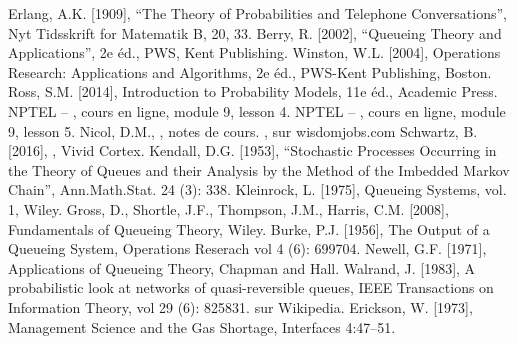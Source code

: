 \begin{thebibliography}{99}
 Erlang, A.K. [1909], ``The Theory of Probabilities and Telephone Conversations'', Nyt Tidsskrift for Matematik B, 20, 33.
 Berry, R. [2002], ``Queueing Theory and Applications'', 2e \'ed., PWS, Kent Publishing.
 Winston, W.L. [2004], Operations Research: Applications and Algorithms, 2e \'ed., PWS-Kent Publishing, Boston.
 Ross, S.M. [2014], Introduction to Probability Models,  11e \'ed., Academic Press. 
 NPTEL --  , cours en ligne, module 9, lesson 4.
 NPTEL --  , cours en ligne, module 9, lesson 5.
 Nicol, D.M., , notes de cours.
 , sur wisdomjobs.com
Schwartz, B. [2016],  , Vivid Cortex.
 Kendall, D.G. [1953], ``Stochastic Processes Occurring in the Theory of Queues and their Analysis by the Method of the Imbedded Markov Chain'', Ann.Math.Stat. 24 (3): 338.
 Kleinrock, L. [1975], Queueing Systems, vol. 1, Wiley.
 Gross, D., Shortle, J.F., Thompson, J.M., Harris, C.M. [2008], Fundamentals of Queueing Theory, Wiley.
 Burke, P.J. [1956], The Output of a Queueing System, Operations Reserach vol 4 (6): 699704.
 Newell, G.F. [1971], Applications of Queueing Theory, Chapman and Hall.
 Walrand, J. [1983], A probabilistic look at networks of quasi-reversible queues, IEEE Transactions on Information Theory, vol 29 (6): 825831.
  sur Wikipedia.
 Erickson, W. [1973], Management Science and the Gas Shortage, Interfaces 4:47–51.
\end{thebibliography}



